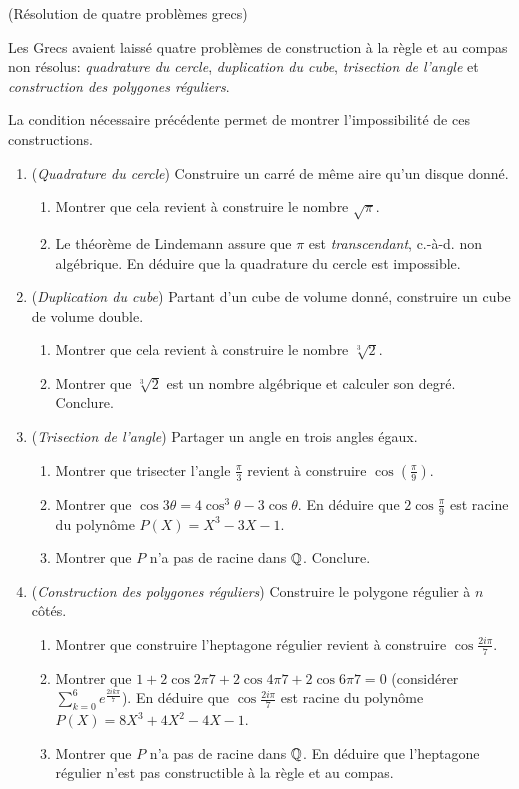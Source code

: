 \documentclass[a4paper,11pt,reqno]{amsart}
\begin{document}
\begin{exo}  (Résolution de quatre problèmes grecs)

  Les Grecs avaient laissé quatre problèmes de construction à la règle et au compas non résolus: \emph{quadrature du cercle}, \emph{duplication du cube}, \emph{trisection de l'angle} et \emph{construction des polygones réguliers}.

  La condition nécessaire précédente permet de montrer l'impossibilité de ces constructions.
  \begin{enumerate}
    \item (\emph{Quadrature du cercle}) Construire un carré de même aire qu'un disque donné.
    \begin{enumerate}
      \item Montrer que cela revient à construire le nombre $\sqrt{\pi}$.
      \item Le théorème de Lindemann assure que $\pi$ est \emph{transcendant}, c.-à-d. non algébrique. En déduire que la quadrature du cercle est impossible.
    \end{enumerate}
    \item (\emph{Duplication du cube}) Partant d'un cube de volume donné, construire un cube de volume double.
    \begin{enumerate}
      \item Montrer que cela revient à construire le nombre $\sqrt[3]{2}$.
      \item Montrer que $\sqrt[3]{2}$ est un nombre algébrique et calculer son degré. Conclure.
    \end{enumerate}
    \item (\emph{Trisection de l'angle})  Partager un angle en trois angles égaux.
    \begin{enumerate}
      \item Montrer que trisecter l'angle $\frac{\pi}{3}$ revient à construire $\cos(\frac{\pi}{9})$.
      \item Montrer que $\cos 3\theta = 4 \cos^3 \theta -3 \cos \theta$. En déduire que $2 \cos \frac{\pi}{9}$ est racine du polynôme $P(X)=X^3-3X-1$.
      \item Montrer que $P$ n'a pas de racine dans $\mathbb{Q}$. Conclure.
    \end{enumerate}
    \item (\emph{Construction des polygones réguliers}) Construire le polygone régulier à $n$ côtés.
    \begin{enumerate}
      \item Montrer que construire l'heptagone régulier revient à construire $\cos\frac{2i\pi}{7}$.
      \item Montrer que $1+2\cos{2\pi}{7}+2\cos{4\pi}{7}+2\cos{6\pi}{7}=0$ (considérer $\sum_{k=0}^6 e^{\frac{2ik\pi}{7}}$). En déduire que $\cos \frac{2i\pi}{7}$ est racine du polynôme $P(X)=8X^3+4X^2-4X-1$.
      \item Montrer que $P$ n'a pas de racine dans $\mathbb{Q}$. En déduire que l'heptagone régulier n'est pas constructible à la règle et au compas.
    \end{enumerate}
  \end{enumerate}
\end{exo}
\end{document}
